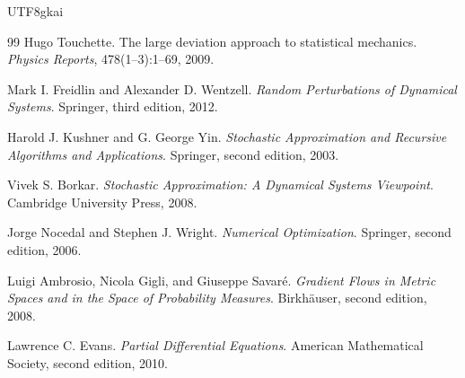 \documentclass[12pt]{article}
\begin{document}
\begin{CJK*}{UTF8}{gkai}
\begin{thebibliography}{99}
Hugo Touchette.
\newblock The large deviation approach to statistical mechanics.
\newblock \emph{Physics Reports}, 478(1--3):1--69, 2009.

Mark I. Freidlin and Alexander D. Wentzell.
\newblock \emph{Random Perturbations of Dynamical Systems}.
\newblock Springer, third edition, 2012.

Harold J. Kushner and G. George Yin.
\newblock \emph{Stochastic Approximation and Recursive Algorithms and Applications}.
\newblock Springer, second edition, 2003.

Vivek S. Borkar.
\newblock \emph{Stochastic Approximation: A Dynamical Systems Viewpoint}.
\newblock Cambridge University Press, 2008.

Jorge Nocedal and Stephen J. Wright.
\newblock \emph{Numerical Optimization}.
\newblock Springer, second edition, 2006.

Luigi Ambrosio, Nicola Gigli, and Giuseppe Savar\'e.
\newblock \emph{Gradient Flows in Metric Spaces and in the Space of Probability Measures}.
\newblock Birkh\"auser, second edition, 2008.

Lawrence C. Evans.
\newblock \emph{Partial Differential Equations}.
\newblock American Mathematical Society, second edition, 2010.

\end{thebibliography}

\end{CJK*}
\end{document}
